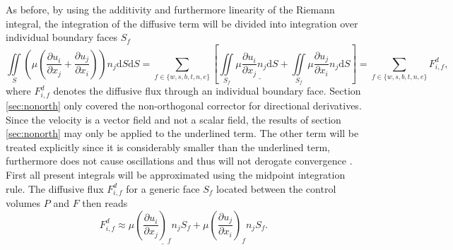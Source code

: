 As before, by using the additivity and furthermore linearity of the Riemann integral, the integration of the diffusive term will be divided into integration over individual boundary faces \(S_f\) 
\begin{displaymath}
  \iint\limits_S \left(\mu \left( \frac{\partial u_i}{\partial x_j} + \frac{\partial u_j}{\partial x_i}\right)\right)n_j \mathrm{d}S \mathrm{d}S
  = \sum_{f \in \{w,s,b,t,n,e\}} \left[
    \iint\limits_{S_f} \mu \underline{\frac{\partial u_i}{\partial x_j}n_j \mathrm{d}S}
  + \iint\limits_{S_f} \mu \frac{\partial u_j}{\partial x_i}n_j \mathrm{d}S \right]
   = \sum_{f \in \{w,s,b,t,n,e\}} F_{i,f}^{d},
\end{displaymath}
where \(F_{i,f}^{d}\) denotes the diffusive flux through an individual boundary face. Section \ref{sec:nonorth} only covered the non-orthogonal corrector for directional derivatives. Since the velocity is a vector field and not a scalar field, the results of section \ref{sec:nonorth} may only be applied to the underlined term. The other term will be treated explicitly since it is considerably smaller than the underlined term, furthermore does not cause oscillations and thus will not derogate convergence \cite{ferziger02}. First all present integrals will be approximated using the midpoint integration rule. The diffusive flux \(F_{i,f}^d\) for a generic face \(S_f\) located between the control volumes \(P\) and \(F\) then reads 
\begin{displaymath}
  F_{i,f}^d \approx \mu \underline{\left(\frac{\partial u_i}{\partial x_j}\right)_f n_j S_f} + \mu \left(\frac{\partial u_j}{\partial x_i}\right)_f n_j S_f.
\end{displaymath}

